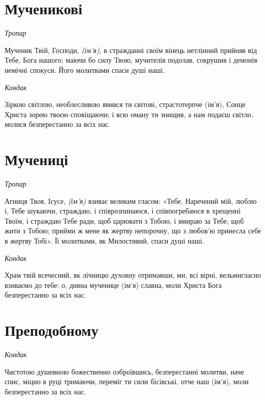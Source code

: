 \documentclass[chapters.tex]{subfiles}
\begin{document}
\section{Мученикові}
\emph{Тропар}

Мученик Твій, Господи, \emph{(ім’я)}, в стражданні своїм вінець нетлінний прийняв від Тебе, Бога нашого; маючи бо силу Твою, мучителів подолав, сокрушив і демонів немічні спокуси. Його молитвами спаси душі наші.

\emph{Кондак}

Зіркою світлою, необлесливою явився ти світові, страстотерпче (ім’я), Сонце Христа зорею твоєю сповіщаючи; і всю оману ти знищив, а нам подаєш світло, молися безперестанно за всіх нас.

\section{Мучениці}
\emph{Тропар}

Агниця Твоя, Ісусе, \emph{(ім’я)} взиває великим гласом: «Тебе, Наречений мій, люблю і, Тебе шукаючи, страждаю, і співрозпинаюся, і співпогребаюся в хрещенні Твоїм, і страждаю Тебе ради, щоб царювати з Тобою, і вмираю за Тебе, щоб жити з Тобою; прийми ж мене як жертву непорочну, що з любов’ю принесла себе в жертву Тобі». Її молитвами, як Милостивий, спаси душі наші.

\emph{Кондак}

Храм твій всечесний, як лічницю духовну отримавши, ми, всі вірні, вельмигласно взиваємо до тебе: о, дивна мученице (ім’я) славна, моли Христа Бога безперестанно за всіх нас.

\section{Преподобному}
\emph{Кондак}

Чистотою душевною божественно озброївшись, безперестанні молитви, наче спис, міцно в руці тримаючи, переміг ти сили бісівські, отче наш (ім’я), моли безперестанно за всіх нас.
\end{document}
